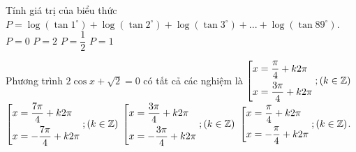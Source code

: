 \begin{ex}%
Tính giá trị của biểu thức $P = \log \left(\tan 1^\circ\right) + \log \left(\tan 2^\circ\right) + \log \left(\tan 3^\circ\right) +. . . + \log \left(\tan 89^\circ\right)$. 
\choice
{\True $P = 0$}
{$P = 2$}
{$P = \dfrac{1}{2}$}
{$P = 1$}
\end{ex}
\begin{ex}%
Phương trình $2\cos x + \sqrt{2} = 0$ có tất cả các nghiệm là
\choice
{$\left[\begin{aligned}
& x = \dfrac{\pi}{4} + k2\pi \\ 
& x = \dfrac{3\pi}{4} + k2\pi \\\end{aligned}\right.; \left(k\in \mathbb{Z}\right)$}
{$\left[\begin{aligned}
& x = \dfrac{7\pi}{4} + k2\pi \\ 
& x = - \dfrac{7\pi}{4} + k2\pi \\\end{aligned}\right.; \left(k\in \mathbb{Z}\right)$}
{\True $\left[\begin{aligned}
& x = \dfrac{3\pi}{4} + k2\pi \\ 
& x = - \dfrac{3\pi}{4} + k2\pi \\\end{aligned}\right.; \left(k\in \mathbb{Z}\right)$}
{$\left[\begin{aligned}
& x = \dfrac{\pi}{4} + k2\pi \\ 
& x = - \dfrac{\pi}{4} + k2\pi \\\end{aligned}\right.; \left(k\in \mathbb{Z}\right)$.}
\end{ex}
